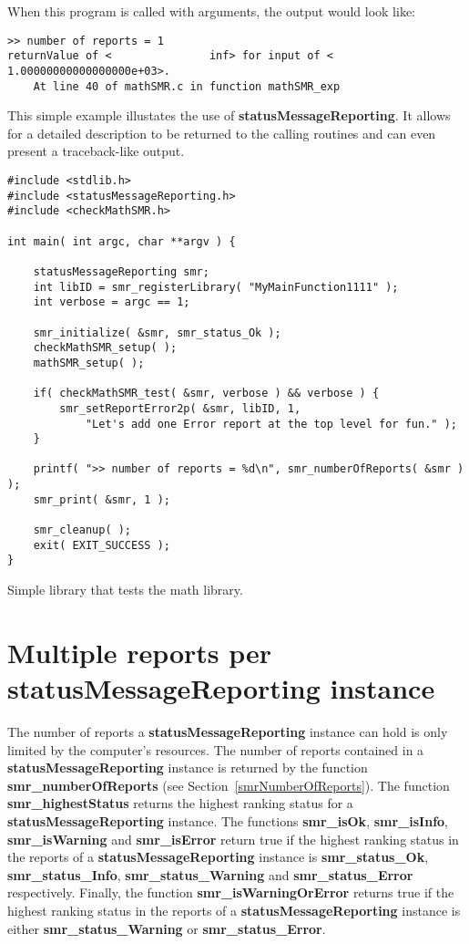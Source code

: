 \documentclass[11pt]{article}
\begin{document}
\noindent
When this program is called with arguments, the output would look like:
\begin{verbatim}
>> number of reports = 1
returnValue of <               inf> for input of <  1.00000000000000000e+03>.
    At line 40 of mathSMR.c in function mathSMR_exp
\end{verbatim}

\noindent
This simple example illustates the use of \textbf{statusMessageReporting}. It allows for a
detailed description to be returned to the calling routines and can even present a traceback-like
output.

\begin{table}
\begin{verbatim}
#include <stdlib.h>
#include <statusMessageReporting.h>
#include <checkMathSMR.h>

int main( int argc, char **argv ) {

    statusMessageReporting smr;
    int libID = smr_registerLibrary( "MyMainFunction1111" );
    int verbose = argc == 1;

    smr_initialize( &smr, smr_status_Ok );
    checkMathSMR_setup( );
    mathSMR_setup( );

    if( checkMathSMR_test( &smr, verbose ) && verbose ) {
        smr_setReportError2p( &smr, libID, 1, 
            "Let's add one Error report at the top level for fun." );
    }

    printf( ">> number of reports = %d\n", smr_numberOfReports( &smr ) );
    smr_print( &smr, 1 );

    smr_cleanup( );
    exit( EXIT_SUCCESS );
}
\end{verbatim}
\caption{Simple library that tests the math library.} \label{ExampleCodeSimple3}
\end{table}


\section{Multiple reports per statusMessageReporting instance}	\label{Append}
The number of reports a \textbf{statusMessageReporting} instance can hold is only limited by the computer's resources.
The number of reports contained in a
\textbf{statusMessageReporting} instance is returned by the function \textbf{smr\_numberOfReports} 
(see Section~\ref{smrNumberOfReports}). The function  
\textbf{smr\_highestStatus} returns the highest ranking status for a \textbf{statusMessageReporting} instance. The functions
\textbf{smr\_isOk}, \textbf{smr\_isInfo}, \textbf{smr\_isWarning} and \textbf{smr\_isError}
 return true if the highest ranking status in the reports of a
\textbf{statusMessageReporting} instance is \textbf{smr\_status\_Ok}, \textbf{smr\_status\_Info}, 
\textbf{smr\_status\_Warning} and \textbf{smr\_status\_Error} respectively.
Finally, the function \textbf{smr\_\-isWarningOrError} returns true if the highest ranking status in the reports of a
\textbf{statusMessageReporting} instance is either \textbf{smr\_status\_Warning} or \textbf{smr\_\-status\_\-Error}.
\end{document}
